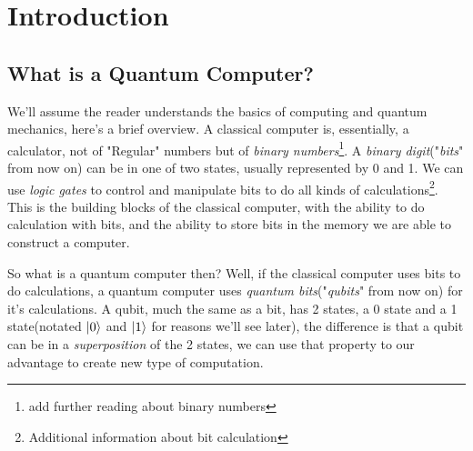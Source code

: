 \documentclass[english, a4paper, 12pt, twoside]{article}
\numberwithin{equation}{section} %
\def\biblio{\clearpage} %
\begin{document}
\def\biblio{} %


\restoregeometry %

\thispagestyle{plain} %


\newpage

\tableofcontents

\newpage
{}
\section{Introduction}
\subsection{What is a Quantum Computer?}
We'll assume the reader understands the basics of computing and quantum mechanics, here's a brief overview. \newline
 A classical computer is, essentially, a calculator, not of "Regular" numbers but of \textit{binary numbers}\footnote{ add further reading about binary numbers}. %
 A \textit{binary digit}("\textit{bits}" from now on) can be in one of two states, usually represented by 0 and 1. We can use \textit{logic gates} to control and manipulate bits to do all kinds of calculations\footnote{Additional information about bit calculation}. This is the building blocks of the classical computer, with the ability to do calculation with bits, and the ability to store bits in the memory we are able to construct a computer.
 
So what is a quantum computer then? Well, if the classical computer uses bits to do calculations, a quantum computer uses \textit{quantum bits}("\textit{qubits}" from now on) for it's calculations. A qubit, much the same as a bit, has 2 states, a 0 state and a 1 state(notated $\ket{0}$ and $\ket{1}$ for reasons we'll see later), the difference is that a qubit can be in a \textit{superposition} of the 2 states, we can use that property to our advantage to create new type of computation.
\end{document}
